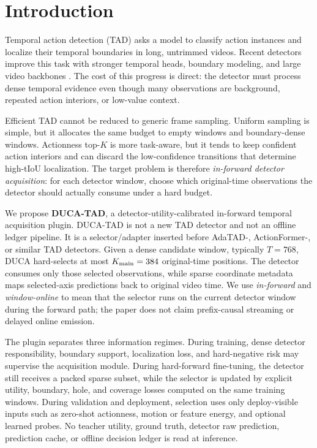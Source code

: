 \section{Introduction}

Temporal action detection (TAD) asks a model to classify action instances and localize their temporal boundaries in long, untrimmed videos. Recent detectors improve this task with stronger temporal heads, boundary modeling, and large video backbones \citep{zhang2022actionformer,shi2023tridet,liu2024adatad}. The cost of this progress is direct: the detector must process dense temporal evidence even though many observations are background, repeated action interiors, or low-value context.

Efficient TAD cannot be reduced to generic frame sampling. Uniform sampling is simple, but it allocates the same budget to empty windows and boundary-dense windows. Actionness top-$K$ is more task-aware, but it tends to keep confident action interiors and can discard the low-confidence transitions that determine high-tIoU localization. The target problem is therefore \emph{in-forward detector acquisition}: for each detector window, choose which original-time observations the detector should actually consume under a hard budget.

We propose \textbf{DUCA-TAD}, a detector-utility-calibrated in-forward temporal acquisition plugin. DUCA-TAD is not a new TAD detector and not an offline ledger pipeline. It is a selector/adapter inserted before AdaTAD-, ActionFormer-, or similar TAD detectors. Given a dense candidate window, typically $T=768$, DUCA hard-selects at most $K_{\mathrm{main}}=384$ original-time positions. The detector consumes only those selected observations, while sparse coordinate metadata maps selected-axis predictions back to original video time. We use \emph{in-forward} and \emph{window-online} to mean that the selector runs on the current detector window during the forward path; the paper does not claim prefix-causal streaming or delayed online emission.

The plugin separates three information regimes. During training, dense detector responsibility, boundary support, localization loss, and hard-negative risk may supervise the acquisition module. During hard-forward fine-tuning, the detector still receives a packed sparse subset, while the selector is updated by explicit utility, boundary, hole, and coverage losses computed on the same training windows. During validation and deployment, selection uses only deploy-visible inputs such as zero-shot actionness, motion or feature energy, and optional learned probes. No teacher utility, ground truth, detector raw prediction, prediction cache, or offline decision ledger is read at inference.

